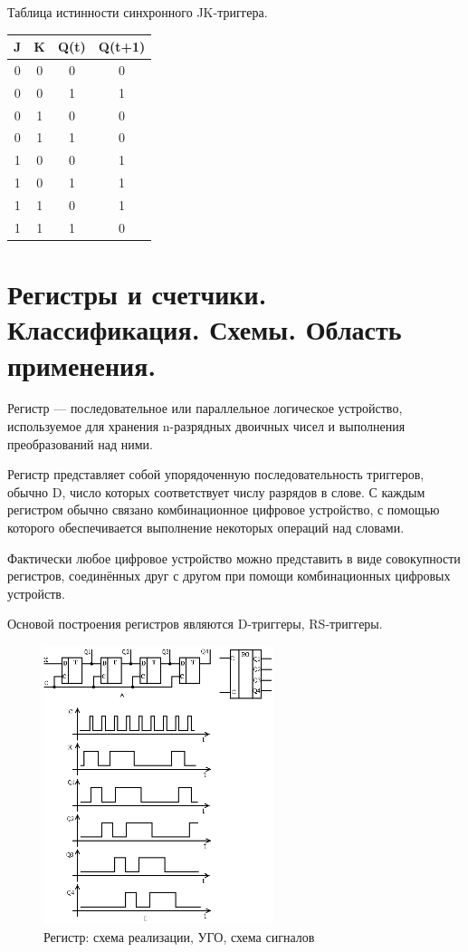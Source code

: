 \documentclass[unicode, 12pt, a4paper, oneside]{article}
\begin{document}
Таблица истинности синхронного JK-триггера.

\begin{tabular}{|c|c|c|c|}
\hline	J	& K	& Q(t)	& Q(t+1)	\\
\hline	0	& 0	& 0		& 0			\\
\hline	0	& 0	& 1		& 1			\\
\hline	0	& 1	& 0		& 0			\\
\hline	0	& 1	& 1		& 0			\\
\hline	1	& 0	& 0		& 1			\\
\hline	1	& 0	& 1		& 1			\\
\hline	1	& 1	& 0		& 1			\\
\hline	1	& 1	& 1		& 0			\\
\hline
\end{tabular}


\section{Регистры и счетчики. Классификация. Схемы. Область применения.}

Регистр — последовательное или параллельное логическое устройство, используемое для хранения n-разрядных двоичных чисел и выполнения преобразований над ними.

Регистр представляет собой упорядоченную последовательность триггеров, обычно D, число которых соответствует числу разрядов в слове. С каждым регистром обычно связано комбинационное цифровое устройство, с помощью которого обеспечивается выполнение некоторых операций над словами.

Фактически любое цифровое устройство можно представить в виде совокупности регистров, соединённых друг с другом при помощи комбинационных цифровых устройств.

Основой построения регистров являются D-триггеры, RS-триггеры.

\begin{figure}[H]
\centering
\includegraphics[width=0.6\textwidth]{14_register.png}
\caption{Регистр: схема реализации, УГО, схема сигналов}
\label{fig:14_register}
\end{figure}
\end{document}
